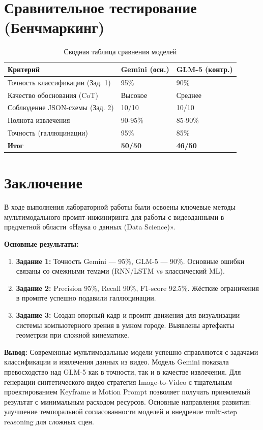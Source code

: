 \documentclass[oneside,a4paper,14pt]{extarticle}
\begin{document}
\section{Сравнительное тестирование (Бенчмаркинг)}
\begin{table}[H]
\centering
\caption{Сводная таблица сравнения моделей}
\begin{tabular}{|l|l|l|}
\hline
\textbf{Критерий} & \textbf{Gemini (осн.)} & \textbf{GLM-5 (контр.)} \\ \hline
Точность классификации (Зад. 1) & 95\% & 90\% \\ \hline
Качество обоснования (CoT) & Высокое & Среднее \\ \hline
Соблюдение JSON-схемы (Зад. 2) & 10/10 & 10/10 \\ \hline
Полнота извлечения & 90-95\% & 85-90\% \\ \hline
Точность (галлюцинации) & 95\% & 85\% \\ \hline
\textbf{Итог} & \textbf{50/50} & \textbf{46/50} \\ \hline
\end{tabular}
\end{table}

\newpage
\section*{Заключение}
В ходе выполнения лабораторной работы были освоены ключевые методы мультимодального промпт-инжиниринга для работы с видеоданными в предметной области «Наука о данных (Data Science)».

\noindent
\textbf{Основные результаты:}
\begin{enumerate}
\item \textbf{Задание 1:} Точность Gemini — 95\%, GLM-5 — 90\%. Основные ошибки связаны со смежными темами (RNN/LSTM vs классический ML).
\item \textbf{Задание 2:} Precision 95\%, Recall 90\%, F1-score 92.5\%. Жёсткие ограничения в промпте успешно подавили галлюцинации.
\item \textbf{Задание 3:} Создан опорный кадр и промпт движения для визуализации системы компьютерного зрения в умном городе. Выявлены артефакты геометрии при сложной кинематике.
\end{enumerate}

\noindent
\textbf{Вывод:} Современные мультимодальные модели успешно справляются с задачами классификации и извлечения данных из видео. Модель Gemini показала превосходство над GLM-5 как в точности, так и в качестве извлечения. Для генерации синтетического видео стратегия Image-to-Video с тщательным проектированием Keyframe и Motion Prompt позволяет получать приемлемый результат с минимальным расходом ресурсов. Основные направления развития: улучшение темпоральной согласованности моделей и внедрение multi-step reasoning для сложных сцен.
\end{document}
